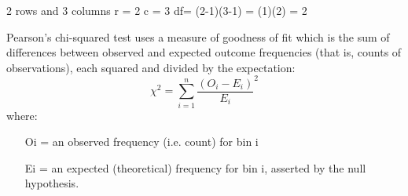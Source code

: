 2 rows and 3 columns r = 2 c = 3 
df= (2-1)(3-1) = (1)(2) = 2



Pearson's chi-squared test uses a measure of goodness of fit which is the sum of differences between observed and expected outcome frequencies (that is, counts of observations), each squared and divided by the expectation:
\[ \chi^2 = \sum_{i=1}^n {\frac{(O_i - E_i)}{E_i}^2} \]
where:

\begin{itemize}
\item[Oi] = an observed frequency (i.e. count) for bin i
\item[Ei] = an expected (theoretical) frequency for bin i, asserted by the null hypothesis.
\end{itemize}
